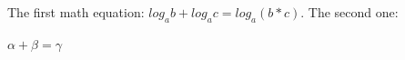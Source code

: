 The first math equation: \(log_a b + log_a c =log_a (b*c)\).
The second one:

\begin{center}
\begin{math}
\alpha + \beta = \gamma
\end{math}
\end{center}

























